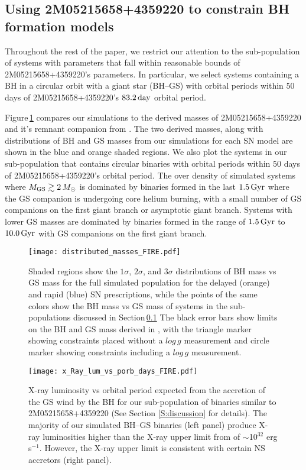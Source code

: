 \documentclass[twocolumn,tighten]{aastex61}
\newcommand{\gyr}{{\rm{Gyr}}}
\newcommand{\days}{\rm{day}}
\begin{document}
\subsection{Using 2M05215658+4359220 to constrain BH formation models}
\label{subS:BH_formation}

Throughout the rest of the paper, we restrict our attention to the sub-population of systems with parameters that fall within reasonable bounds of 2M05215658+4359220's parameters. In particular, we select systems containing a BH in a circular orbit with a giant star (BH--GS) with orbital periods within $50$ days of 2M05215658+4359220's $83.2\,\days$ orbital period. 

Figure\,\ref{fig:mass_mass} compares our simulations to the derived masses of 2M05215658+4359220 and it's remnant companion from \cite{Thompson2018}. The two derived masses, along with distributions of BH and GS masses from our simulations for each SN model are shown in the blue and orange shaded regions. We also plot the systems in our sub-population that contains circular binaries with orbital periods within $50$ days of 2M05215658+4359220's orbital period. The over density of simulated systems where $M_{\rm{GS}}\gtrsim2\,M_{\odot}$ is dominated by binaries formed in the last $1.5\,\gyr$ where the GS companion is undergoing core helium burning, with a small number of GS companions on the first giant branch or asymptotic giant branch. Systems with lower GS masses are dominated by binaries formed in the range of $1.5\,\gyr$ to $10.0\,\gyr$ with GS companions on the first giant branch.

\begin{figure}
    \centering
    \texttt{[image: distributed\_masses\_FIRE.pdf]}
    \caption{Shaded regions show the $1\sigma$, $2\sigma$, and $3\sigma$ distributions of BH mass vs GS mass for the full simulated population for the delayed (orange) and rapid (blue) SN prescriptions, while the points of the same colors show the BH mass vs GS mass of systems in the sub-populations discussed in Section\,\ref{subS:BH_formation} The black error bars show limits on the BH and GS mass derived in \citet{Thompson2018}, with the triangle marker showing constraints placed without a $log\,g$ measurement and circle marker showing constraints including a $log\,g$ measurement.}
    \label{fig:mass_mass}
\end{figure}

\begin{figure*}
    \centering
    \texttt{[image: x\_Ray\_lum\_vs\_porb\_days\_FIRE.pdf]}
    \caption{X-ray luminosity vs orbital period expected from the accretion of the GS wind by the BH for our sub-population of binaries similar to 2M05215658$+$4359220 (See Section \ref{S:discussion} for details). The majority of our simulated BH--GS binaries (left panel) produce X-ray luminosities higher than the X-ray upper limit from \citet{Thompson2018} of $\sim$10$^{32}$ erg s$^{-1}$. However, the X-ray upper limit is consistent with certain NS accretors (right panel).}
    \label{fig:x_rays}
\end{figure*}
\end{document}

